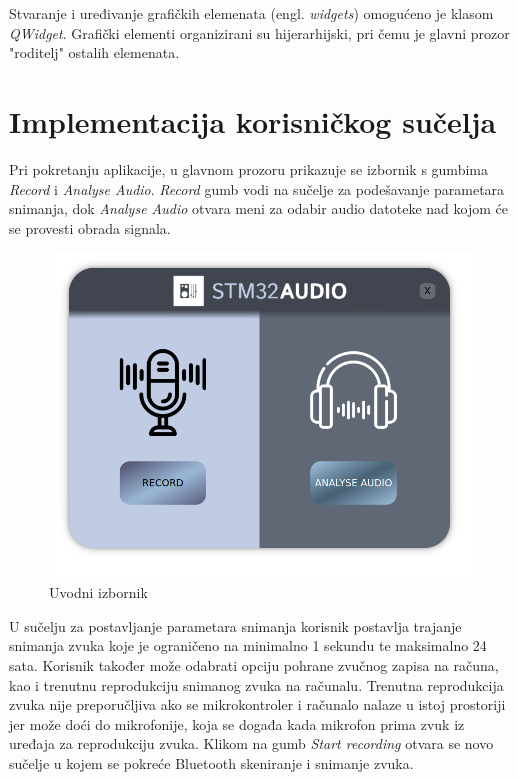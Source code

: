 Stvaranje i uređivanje grafičkih elemenata (engl. \textit{widgets}) omogućeno je klasom \textit{QWidget}. Grafički elementi organizirani su hijerarhijski, pri čemu je glavni prozor "roditelj" ostalih elemenata. 

\section{Implementacija korisničkog sučelja}

Pri pokretanju aplikacije, u glavnom prozoru prikazuje se izbornik s gumbima \textit{Record} i \textit{Analyse Audio}. \textit{Record} gumb vodi na sučelje za podešavanje parametara snimanja, dok \textit{Analyse Audio} otvara meni za odabir audio datoteke nad kojom će se provesti obrada signala.

\begin{figure}[ht]
	\includegraphics[width=\linewidth]{imgs/intro_form}
	\caption{Uvodni izbornik}
	\label{fig:intro_form}
\end{figure}


U sučelju za postavljanje parametara snimanja korisnik postavlja trajanje snimanja zvuka koje je ograničeno na minimalno 1 sekundu te maksimalno 24 sata. Korisnik također može odabrati opciju pohrane zvučnog zapisa na računa, kao i trenutnu reprodukciju snimanog zvuka na računalu. Trenutna reprodukcija zvuka nije preporučljiva ako se mikrokontroler i računalo nalaze u istoj prostoriji jer može doći do mikrofonije, koja se događa kada mikrofon prima zvuk iz uređaja za reprodukciju zvuka. Klikom na gumb \textit{Start recording} otvara se novo sučelje u kojem se pokreće Bluetooth skeniranje i snimanje zvuka.

